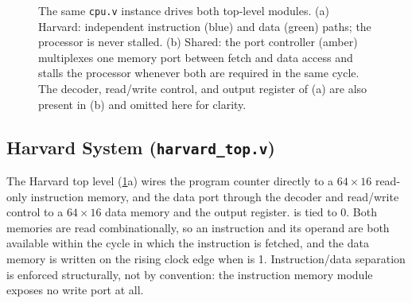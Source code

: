\documentclass[conference]{IEEEtran}
\newcommand{\sig}[1]{\texttt{\detokenize{#1}}}
\begin{document}
\begin{figure}[t]
\caption{The same \texttt{cpu.v} instance drives both top-level modules. (a) Harvard: independent
instruction (blue) and data (green) paths; the processor is never stalled. (b) Shared: the port
controller (amber) multiplexes one memory port between fetch and data access and stalls the
processor whenever both are required in the same cycle. The decoder, read/write control, and output
register of (a) are also present in (b) and omitted here for clarity.}
\label{fig:arch}
\end{figure}

\subsection{Harvard System (\texttt{harvard\_top.v})}
The Harvard top level (\cref{fig:arch}a) wires the program counter directly to a $64\times16$
read-only instruction memory, and the data port through the decoder and read/write control to a
$64\times16$ data memory and the output register. \sig{stall} is tied to 0. Both memories are read
combinationally, so an instruction and its operand are both available within the cycle in which the
instruction is fetched, and the data memory is written on the rising clock edge when \sig{d_we} is
1. Instruction/data separation is enforced structurally, not by convention: the instruction memory
module exposes no write port at all.
\end{document}
